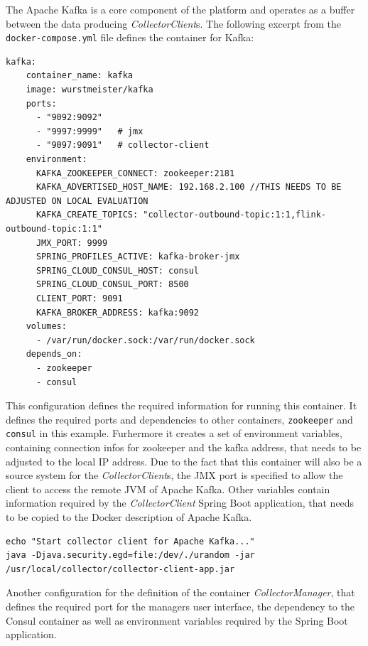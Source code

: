 The Apache Kafka is a core component of the platform and operates as a buffer between the data producing \textit{CollectorClient}s.
The following excerpt from the \verb|docker-compose.yml| file defines the container for Kafka:
\begin{lstlisting}[caption={Container definition Kafka}, captionpos=b, label={lst:docker-kafka}]
  kafka:
    container_name: kafka
    image: wurstmeister/kafka
    ports:
      - "9092:9092"
      - "9997:9999"   # jmx
      - "9097:9091"   # collector-client
    environment:
      KAFKA_ZOOKEEPER_CONNECT: zookeeper:2181
      KAFKA_ADVERTISED_HOST_NAME: 192.168.2.100 //THIS NEEDS TO BE ADJUSTED ON LOCAL EVALUATION
      KAFKA_CREATE_TOPICS: "collector-outbound-topic:1:1,flink-outbound-topic:1:1"
      JMX_PORT: 9999
      SPRING_PROFILES_ACTIVE: kafka-broker-jmx
      SPRING_CLOUD_CONSUL_HOST: consul
      SPRING_CLOUD_CONSUL_PORT: 8500
      CLIENT_PORT: 9091
      KAFKA_BROKER_ADDRESS: kafka:9092
    volumes:
      - /var/run/docker.sock:/var/run/docker.sock
    depends_on:
      - zookeeper
      - consul
\end{lstlisting}

This configuration defines the required information for running this container. It defines the required ports and dependencies to other containers,
\verb|zookeeper| and \verb|consul| in this example. Furhermore it creates a set of environment variables, containing
connection infos for zookeeper and the kafka address, that needs to be adjusted to the local IP address. Due to the fact that
this container will also be a source system for the \textit{CollectorClient}s, the JMX port is specified to allow the client to access
the remote JVM of Apache Kafka. Other variables contain information
required by the \textit{CollectorClient} Spring Boot application, that needs to be copied to the Docker description of Apache Kafka.

\begin{lstlisting}[caption={CollectorManager copy in Apache Kafka conatiner}, captionpos=b, label={lst:docker-copy-client}]
echo "Start collector client for Apache Kafka..."
java -Djava.security.egd=file:/dev/./urandom -jar /usr/local/collector/collector-client-app.jar
\end{lstlisting}

Another configuration for the definition of the container \textit{CollectorManager}, that defines the required port for the managers user
interface, the dependency to the Consul container as well as environment variables required by the Spring Boot application.

